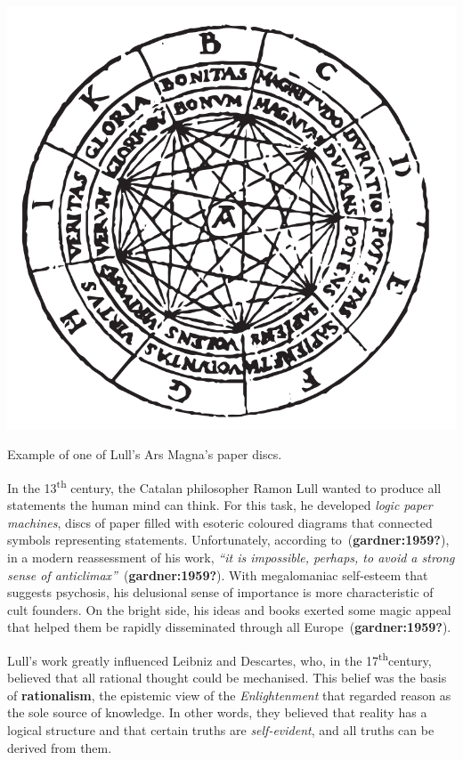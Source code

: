 \documentclass[
  letterpaper,
  DIV=11,
  numbers=noendperiod,
  oneside]{scrreprt}
\begin{document}
\begin{marginfigure}

{\centering \includegraphics{imgs/ars_magna_disc.png}

}

\caption{\label{fig-ars_magna_disc}Example of one of Lull's Ars Magna's
paper discs.}

\end{marginfigure}

In the 13\textsuperscript{th} century, the Catalan philosopher Ramon
Lull wanted to produce all statements the human mind can think. For this
task, he developed \emph{logic paper machines}, discs of paper filled
with esoteric coloured diagrams that connected symbols representing
statements. Unfortunately, according to~(\textbf{gardner:1959?}), in a
modern reassessment of his work, \emph{``it is impossible, perhaps, to
avoid a strong sense of anticlimax''}~(\textbf{gardner:1959?}). With
megalomaniac self-esteem that suggests psychosis, his delusional sense
of importance is more characteristic of cult founders. On the bright
side, his ideas and books exerted some magic appeal that helped them be
rapidly disseminated through all Europe~(\textbf{gardner:1959?}).

Lull's work greatly influenced Leibniz and Descartes, who, in the
17\textsuperscript{th}century, believed that all rational thought could
be mechanised. This belief was the basis of \textbf{rationalism}, the
epistemic view of the \emph{Enlightenment} that regarded reason as the
sole source of knowledge. In other words, they believed that reality has
a logical structure and that certain truths are \emph{self-evident}, and
all truths can be derived from them.
\end{document}

